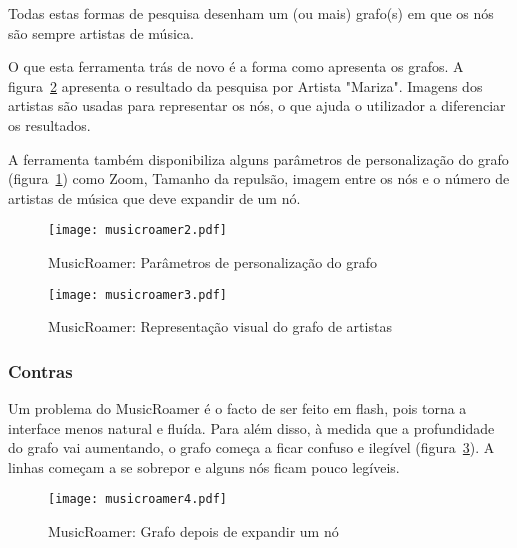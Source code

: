   Todas estas formas de pesquisa desenham um (ou mais) grafo(s) em que os nós são sempre artistas de música.

  O que esta ferramenta trás de novo é a forma como apresenta os grafos.
  A figura~\ref{fig:sota_musicroamer3} apresenta o resultado da pesquisa por Artista "Mariza".
  Imagens dos artistas são usadas para representar os nós, o que ajuda o utilizador a diferenciar os resultados.

  A ferramenta também disponibiliza alguns parâmetros de personalização do grafo (figura~\ref{fig:sota_musicroamer2}) como Zoom, Tamanho da repulsão, imagem entre os nós e o número de artistas de música que deve expandir de um nó.

  \begin{figure}[tb]
    \begin{center}
      \texttt{[image: musicroamer2.pdf]}
    \end{center}
    \caption{MusicRoamer: Parâmetros de personalização do grafo}
    \label{fig:sota_musicroamer2}
  \end{figure}



  \begin{figure}[tb]
    \begin{center}
      \texttt{[image: musicroamer3.pdf]}
    \end{center}
    \caption{MusicRoamer: Representação visual do grafo de artistas}
    \label{fig:sota_musicroamer3}
  \end{figure}


  \subsubsection{Contras} %
  \label{ssub:contras}

  Um problema do MusicRoamer é o facto de ser feito em flash, pois torna a interface menos natural e fluída.
  Para além disso, à medida que a profundidade do grafo vai aumentando, o grafo começa a ficar confuso e ilegível (figura~\ref{fig:sota_musicroamer4}).
  A linhas começam a se sobrepor e alguns nós ficam pouco legíveis.

  \begin{figure}[tb]
    \begin{center}
      \texttt{[image: musicroamer4.pdf]}
    \end{center}
    \caption{MusicRoamer: Grafo depois de expandir um nó}
    \label{fig:sota_musicroamer4}
  \end{figure}

